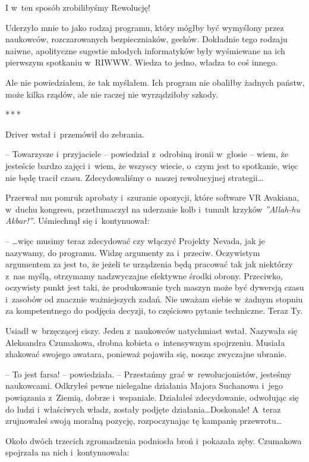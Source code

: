\documentclass[oneside,polish,12pt,sfheadings]{mwbk}
\newcommand{\threeast}{\bigskip\par\centerline{*\,*\,*}\medskip\par}%
\begin{document}
I w~ten sposób zrobilibyśmy Rewolucję!

Uderzyło mnie to jako rodzaj programu, który mógłby być wymyślony przez
naukowców, rozczarowanych bezpieczniaków, geeków. Dokładnie tego rodzaju
naiwne, apolityczne sugestie młodych informatyków były wyśmiewane na ich
pierwszym spotkaniu w~RIWWW. Wiedza to jedno, władza to coś innego.

Ale nie powiedziałem, że tak myślałem. Ich program nie obaliłby żadnych
państw, może kilka rządów, ale nie raczej nie wyrządziłoby szkody.

\threeast

Driver wstał i~przemówił do zebrania.

-- Towarzysze i~przyjaciele -- powiedział z~odrobiną ironii w~głosie --
wiem, że jesteście bardzo zajęci i~wiem, że wszyscy wiecie, o~czym jest
to spotkanie, więc nie będę tracił czasu. Zdecydowaliśmy o~naszej
rewolucyjnej strategii\ldots

Przerwał mu pomruk aprobaty i~szuranie opozycji, które software VR
Avakiana, w~duchu kongresu, przetłumaczył na uderzanie kolb i~tumult
krzyków \emph{''Allah-hu Akbar!''}. Uśmiechnął się i~kontynuował:

-- \ldots więc musimy teraz zdecydować czy włączyć Projekty Nevada, jak je
nazywamy, do programu. Widzę argumenty za i~przeciw. Oczywistym
argumentem za jest to, że jeżeli te urządzenia będą pracować tak jak
niektórzy z~nas myślą, otrzymamy nadzwyczajne efektywne środki obrony.
Przeciwko, oczywisty punkt jest taki, że produkowanie tych maszyn może
być dywersją czasu i~zasobów od znacznie ważniejszych zadań. Nie uważam
siebie w~żadnym stopniu za kompetentnego do podjęcia decyzji, to
częściowo pytanie techniczne. Teraz Ty.

Usiadł w~brzęczącej ciszy. Jeden z~naukowców natychmiast wstał. Nazywała
się Aleksandra Czumakowa, drobna kobieta o~intensywnym spojrzeniu.
Musiała zhakować swojego awatara, ponieważ pojawiła się, nosząc
zwyczajne ubranie.

-- To jest farsa! -- powiedziała. -- Przestańmy grać w~rewolucjonistów,
jesteśmy naukowcami. Odkryłeś pewne nielegalne działania Majora
Suchanowa i~jego powiązania z~Ziemią, dobrze i~wspaniale. Działałeś
zdecydowanie, odwołując się do ludzi i~właściwych władz, zostały podjęte
działania\ldots Doskonale! A~teraz zrujnowałeś swoją moralną pozycję,
rozpoczynając tę kampanię przewrotu\ldots

Około dwóch trzecich zgromadzenia podniosła broń i~pokazała zęby.
Czumakowa spojrzała na nich i~kontynuowała:
\end{document}
